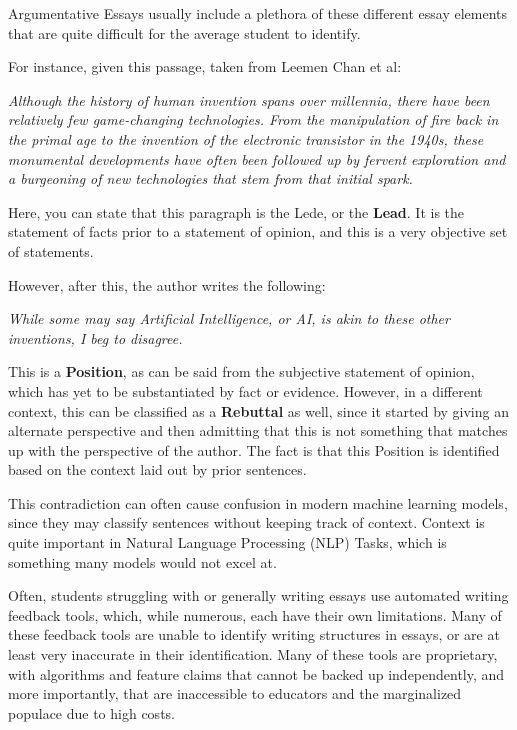 \documentclass[12pt]{article}
\begin{document}
{Argumentative Essays usually include a plethora of these different essay elements that are quite difficult for the average student to identify.

For instance, given this passage, taken from Leemen Chan et al:

\begin{displayquote}
\emph{Although the history of human invention spans over millennia, there have been relatively few game-changing technologies. From the manipulation of fire back in the primal age to the invention of the electronic transistor in the 1940s, these monumental developments have often been followed up by fervent exploration and a burgeoning of new technologies that stem from that initial spark.}
\end{displayquote}

Here, you can state that this paragraph is the Lede, or the \textbf{Lead}. It is the statement of facts prior to a statement of opinion, and this is a very objective set of statements.

However, after this, the author writes the following:

\begin{displayquote}
\emph{While some may say Artificial Intelligence, or AI, is akin to these other inventions, I beg to disagree.}
\end{displayquote}

This is a \textbf{Position}, as can be said from the subjective statement of opinion, which has yet to be substantiated by fact or evidence. However, in a different context, this can be classified as a \textbf{Rebuttal} as well, since it started by giving an alternate perspective and then admitting that this is not something that matches up with the perspective of the author. The fact is that this Position is identified based on the context laid out by prior sentences.

This contradiction can often cause confusion in modern machine learning models, since they may classify sentences without keeping track of context. Context is quite important in Natural Language Processing (NLP) Tasks, which is something many models would not excel at.

Often, students struggling with or generally writing essays use automated writing feedback tools, which, while numerous, each have their own limitations. Many of these feedback tools are unable to identify writing structures in essays, or are at least very inaccurate in their identification. Many of these tools are proprietary, with algorithms and feature claims that cannot be backed up independently, and more importantly, that are inaccessible to educators and the marginalized populace due to high costs.

}
\end{document}
